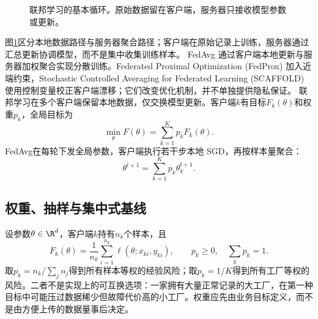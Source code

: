 \begin{figure}[htbp]
\centering
{}
\caption{联邦学习的基本循环。原始数据留在客户端，服务器只接收模型参数或更新。}
\label{fig:federated-basic-loop}
\end{figure}
图\ref{fig:federated-basic-loop}区分本地数据路径与服务器聚合路径；客户端在原始记录上训练，服务器通过汇总更新协调模型，而不是集中收集训练样本。
FedAvg 通过客户端本地更新与服务器加权聚合实现分散训练\cite{mcmahan2017fedavg}。Federated Proximal Optimization (FedProx) 加入近端约束，Stochastic Controlled Averaging for Federated Learning (SCAFFOLD) 使用控制变量校正客户端漂移\cite{li2020fedprox,karimireddy2020scaffold}；它们改变优化机制，并不单独提供隐私保证。
联邦学习在多个客户端保留本地数据，仅交换模型更新。客户端$k$有目标$F_k(\theta)$和权重$p_k$，全局目标为
\begin{equation}
 \min_\theta F(\theta)=\sum_{k=1}^{K}p_kF_k(\theta).
\end{equation}
FedAvg在每轮下发全局参数，客户端执行若干步本地 SGD，再按样本量聚合：
\begin{equation}
 \theta^{t+1}=\sum_{k=1}^{K}p_k\theta_k^{t+1}.
\end{equation}

\subsection{权重、抽样与集中式基线}
设参数$\theta\in\R^d$，客户端$k$持有$n_k$个样本，且
\begin{equation}
 F_k(\theta)=\frac1{n_k}\sum_{i=1}^{n_k}\ell(\theta;x_{ki},y_{ki}),
 \qquad p_k\geq0,\quad\sum_kp_k=1.
\end{equation}
取$p_k=n_k/\sum_jn_j$得到所有样本等权的经验风险；取$p_k=1/K$得到所有工厂等权的风险。二者不是实现上的可互换选项：一家拥有大量正常记录的大工厂，在第一种目标中可能压过数据稀少但故障代价高的小工厂。权重应先由业务目标定义，而不是由方便上传的数据量事后决定。


